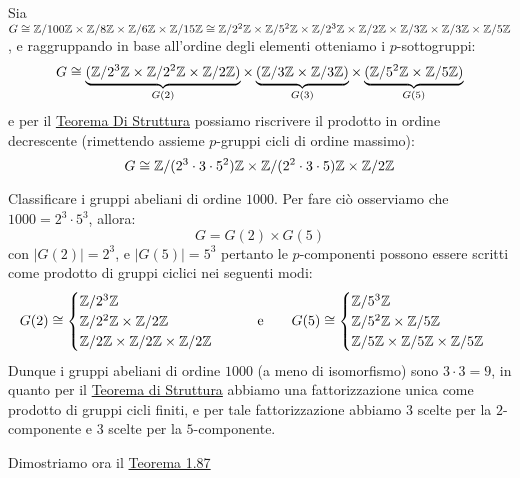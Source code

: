 \documentclass[11pt]{scrartcl}
\begin{document}
\begin{example}
    Sia $G \cong \mathbb{Z}/{100}\mathbb{Z} \times \mathbb{Z}/{8}\mathbb{Z} \times \mathbb{Z}/{6}\mathbb{Z} \times \mathbb{Z}/{15}\mathbb{Z} \cong \mathbb{Z}/{2^2}\mathbb{Z} \times \mathbb{Z}/{5^2}\mathbb{Z} \times \mathbb{Z}/{2^3}\mathbb{Z} \times \mathbb{Z}/{2}\mathbb{Z} \times \mathbb{Z}/{3}\mathbb{Z} \times \mathbb{Z}/{3}\mathbb{Z} \times \mathbb{Z}/{5}\mathbb{Z}$, e raggruppando in base all'ordine degli elementi
    otteniamo i $p$-sottogruppi:
        \[ G \cong \underbrace{(\mathbb{Z}/{2^3}\mathbb{Z} \times \mathbb{Z}/{2^2}\mathbb{Z} \times \mathbb{Z}/{2}\mathbb{Z})}_{G(2)} \times \underbrace{(\mathbb{Z}/{3}\mathbb{Z} \times \mathbb{Z}/{3}\mathbb{Z})}_{G(3)} \times \underbrace{(\mathbb{Z}/{5^2}\mathbb{Z} \times \mathbb{Z}/{5}\mathbb{Z})}_{G(5)}
            \]
    e per il \hyperref[t:struttura]{Teorema Di Struttura} possiamo riscrivere il prodotto in ordine decrescente (rimettendo assieme $p$-gruppi cicli di ordine massimo):
        \[ G \cong \mathbb{Z}/{(2^3\cdot 3 \cdot 5^2)}\mathbb{Z} \times \mathbb{Z}/{(2^2 \cdot 3 \cdot 5)}\mathbb{Z} \times \mathbb{Z}/{2}\mathbb{Z}
            \]
\end{example}

\begin{example}
    Classificare i gruppi abeliani di ordine $1000$. Per fare ciò osserviamo che $1000 = 2^3 \cdot 5^3$, allora:
    \[  G = G(2) \times G(5)
        \]
    con $|G(2)| = 2^3$, e $|G(5)| = 5^3$ pertanto le $p$-componenti possono essere scritti come prodotto di gruppi ciclici nei seguenti modi:
    \[ G(2) \cong \begin{cases}
                    \mathbb{Z}/{2^3}\mathbb{Z} \\
                    \mathbb{Z}/{2^2}\mathbb{Z} \times \mathbb{Z}/{2}\mathbb{Z} \\
                    \mathbb{Z}/{2}\mathbb{Z} \times \mathbb{Z}/{2}\mathbb{Z} \times \mathbb{Z}/{2}\mathbb{Z}
                \end{cases}
    \qquad \text e \qquad
    G(5) \cong \begin{cases}
        \mathbb{Z}/{5^3}\mathbb{Z} \\
        \mathbb{Z}/{5^2}\mathbb{Z} \times \mathbb{Z}/{5}\mathbb{Z} \\
        \mathbb{Z}/{5}\mathbb{Z} \times \mathbb{Z}/{5}\mathbb{Z} \times \mathbb{Z}/{5}\mathbb{Z}
    \end{cases}
        \]
    Dunque i gruppi abeliani di ordine $1000$ (a meno di isomorfismo) sono $3\cdot 3 = 9$, in quanto per il \hyperref[t:struttura]{Teorema di Struttura} abbiamo
    una fattorizzazione unica come prodotto di gruppi cicli finiti, e per tale fattorizzazione abbiamo $3$ scelte per la $2$-componente e $3$ scelte per la $5$-componente.
\end{example}

Dimostriamo ora il \hyperref[t:t1]{Teorema 1.87}
\end{document}
